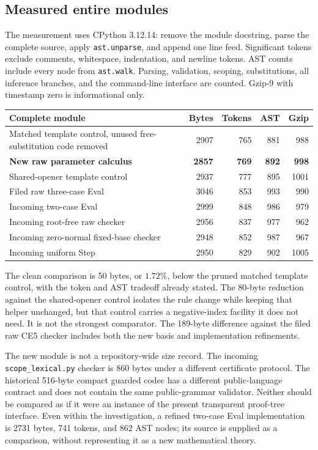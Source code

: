 \subsection{Measured entire modules}

The measurement uses CPython 3.12.14: remove the module docstring, parse
the complete source, apply \texttt{ast.unparse}, and append one line feed.
Significant tokens exclude comments, whitespace, indentation, and newline
tokens. AST counts include every node from \texttt{ast.walk}. Parsing,
validation, scoping, substitutions, all inference branches, and the
command-line interface are counted. Gzip-9 with timestamp zero is
informational only.

\begin{center}
\small
\begin{tabularx}{\linewidth}{Xrrrr}
\toprule
Complete module & Bytes & Tokens & AST & Gzip\\
\midrule
Matched template control, unused free-substitution code removed
 & 2907 & 765 & 881 & 988\\
\textbf{New raw parameter calculus}
 & \textbf{2857} & \textbf{769} & \textbf{892} & \textbf{998}\\
Shared-opener template control & 2937 & 777 & 895 & 1001\\
Filed raw three-case Eval & 3046 & 853 & 993 & 990\\
Incoming two-case Eval & 2999 & 848 & 986 & 979\\
Incoming root-free raw checker & 2956 & 837 & 977 & 962\\
Incoming zero-normal fixed-base checker & 2948 & 852 & 987 & 967\\
Incoming uniform Step & 2950 & 829 & 902 & 1005\\
\bottomrule
\end{tabularx}
\end{center}

The clean comparison is 50 bytes, or $1.72\%$, below the pruned matched
template control, with the token and AST tradeoff already stated.
The 80-byte reduction against the shared-opener control isolates the
rule change while keeping that helper unchanged, but that control carries
a negative-index facility it does not need. It is not the strongest
comparator. The 189-byte difference against the filed raw CE5 checker
includes both the new basis and implementation refinements.

The new module is not a repository-wide size record. The incoming
\texttt{scope\_lexical.py} checker is 860 bytes under a different
certificate protocol. The historical 516-byte compact guarded codec
has a different public-language contract and does not contain the same
public-grammar validator. Neither should be compared as if it were
an instance of the present transparent proof-tree interface. Even within
the investigation, a refined two-case Eval implementation is 2731 bytes,
741 tokens, and 862 AST nodes; its source is supplied as a comparison,
without representing it as a new mathematical theory.

